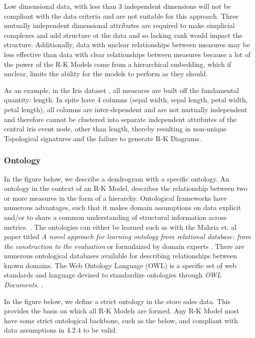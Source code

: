 Low dimensional data, with less than 3 independent dimensions will not be compliant with the data criteria and are not suitable for this approach. Three mutually independent dimensional attributes are required to make simplicial complexes and add structure ot the data and so lacking rank would impact the structure. Additionally, data with unclear relationships between measures may be less effective than data with clear relationships between measures because a lot of the power of the R-K Models come from a hierarchical embedding, which if unclear, limits the ability for the models to perform as they should.

As an example, in the Iris dataset \cite{iris_dataset}, all measures are built off the fundamental quantity: length. In spite have 4 columns (sepal width, sepal length, petal width, petal length), all columns are inter-dependent and are not mutually independent and therefore cannot be clustered into separate independent attributes of the central iris event node, other than length, thereby resulting in non-unique Topological signatures and the failure to generate  R-K Diagrams.

\subsubsection{Ontology}

In the figure below, we describe a dendrogram with a specific ontology. An ontology in the context of an R-K Model, describes the relationship between two or more measures in the form of a hierarchy. Ontological frameworks have numerous advantages, such that it makes domain assumptions on data explicit and/or to share a common understanding of structural information across metrics. \cite{ben_mahria_chaker_zahi_2021}. The ontologies can either be learned such as with the Mahria et. al paper titled \textit{A novel approach for learning ontology from relational database: from the construction to the evaluation} or formulaized by domain experts \cite{ben_mahria_chaker_zahi_2021}. There are numerous ontological databases available for describing relationships between known domains. The Web Ontology Language (OWL) is a specific set of web standards and language devised to standardize ontologies through \textit{OWL Documents}. \cite{owl_semantic_web_standards_2012}.

In the figure below, we define a strict ontology in the store sales data. This provides the basis on which all R-K Models are formed. Any R-K Model most have some strict ontological backbone, such as the below, and compliant with data assumptions in 4.2.4 to be valid.

